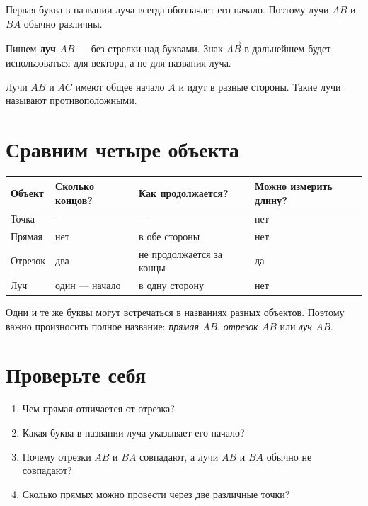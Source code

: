 Первая буква в названии луча всегда обозначает его начало. Поэтому лучи
\(AB\) и \(BA\) обычно различны.

\begin{notebox}
  Пишем \textbf{луч \(AB\)} — без стрелки над буквами. Знак
  \(\overrightarrow{AB}\) в дальнейшем будет использоваться для вектора,
  а не для названия луча.
\end{notebox}

\oppositeraysfigure

Лучи \(AB\) и \(AC\) имеют общее начало \(A\) и идут в разные стороны.
Такие лучи называют противоположными.

\section{Сравним четыре объекта}

\objectscomparisonfigure

\begin{center}
  \renewcommand{\arraystretch}{1.38}
  \begin{tabularx}{\textwidth}{
    >{\raggedright\arraybackslash}p{}
    >{\centering\arraybackslash}p{}
    >{\raggedright\arraybackslash}p{}
    >{\centering\arraybackslash}X}
    \toprule
    \rowcolor{TableHeader}
    Объект & Сколько концов? & Как продолжается? & Можно измерить длину? \\
    \midrule
    Точка & — & — & нет \\
    Прямая & нет & в обе стороны & нет \\
    Отрезок & два & не продолжается за концы & да \\
    Луч & один — начало & в одну сторону & нет \\
    \bottomrule
  \end{tabularx}
\end{center}

\begin{warningbox}
  Одни и те же буквы могут встречаться в названиях разных объектов. Поэтому
  важно произносить полное название: \textit{прямая \(AB\)},
  \textit{отрезок \(AB\)} или \textit{луч \(AB\)}.
\end{warningbox}

\section{Проверьте себя}

\begin{questionsbox}
  \begin{enumerate}
    \item Чем прямая отличается от отрезка?
    \item Какая буква в названии луча указывает его начало?
    \item Почему отрезки \(AB\) и \(BA\) совпадают, а лучи \(AB\) и
      \(BA\) обычно не совпадают?
    \item Сколько прямых можно провести через две различные точки?
  \end{enumerate}
\end{questionsbox}
